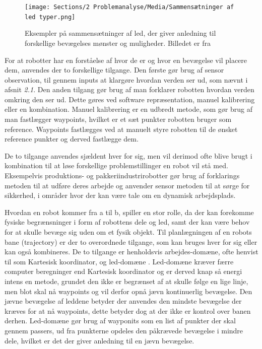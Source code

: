\begin{figure} [H]
    \centering
    \texttt{[image: Sections/2 Problemanalyse/Media/Sammensætninger af led typer.png]}
    \caption{Eksempler på sammensætninger af led, der giver anledning til forskellige bevægelses mønster og muligheder. Billedet er fra\parencite{Niku2020IntroductionApplications}}
    \label{fig: Sammensætniger af led}
\end{figure}

For at robotter har en forståelse af hvor de er og hvor en bevægelse vil placere dem, anvendes der to forskellige tilgange. Den første gør brug af sensor observation, til gennem inputs at klargøre hvordan verden ser ud, som nævnt i afsnit \textit{2.1}. Den anden tilgang gør brug af man forklarer robotten hvordan verden omkring den ser ud. Dette gøres ved software repræsentation, manuel kalibrering eller en kombination. Manuel kalibrering er en udbredt metode, som gør brug af man fastlægger waypoints, hvilket er et sæt punkter robotten bruger som reference. Waypoints fastlægges ved at manuelt styre robotten til de ønsket reference punkter og derved fastlægge dem.

De to tilgange anvendes sjældent hver for sig, men vil derimod ofte blive brugt i kombination til at løse forskellige problemstillinger en robot vil stå med. Eksempelvis produktions- og pakkeriindustrirobotter gør brug af forklarings metoden til at udføre deres arbejde og anvender sensor metoden til at sørge for sikkerhed, i områder hvor der kan være tale om en dynamisk arbejdsplads.


Hvordan en robot kommer fra a til b, spiller en stor rolle, da der kan forekomme fysiske begrænsninger i form af robottens dele og led, samt der kan være behov for at skulle bevæge sig uden om et fysik objekt. Til planlægningen af en robots bane 
 (trajectory) er der to overordnede tilgange, som kan bruges hver for sig eller kan også kombineres. De to tilgange er henholdsvis arbejdes-domæne, ofte henvist til som Kartesisk koordinator, og led-domæne \parencite{Castro2019TrajectoryManipulators}. Led-domæne kræver færre computer beregninger end Kartesisk koordinator og er derved knap så energi intens en metode, grundet den ikke er begrænset af at skulle følge en lige linje, men blot skal nå waypoints og vil derfor opnå jævn kontinuerlig bevægelse. Den jævne bevægelse af leddene betyder der anvendes den mindste bevægelse der kræves for at nå waypoints, dette betyder dog at der ikke er kontrol over banen derhen.
Led-domæne gør brug af wayponits som en list af punkter der skal gennem passers, ud fra punkterne opdeles den påkrævede bevægelse i mindre dele, hvilket er det der giver anledning til en jævn bevægelse.


